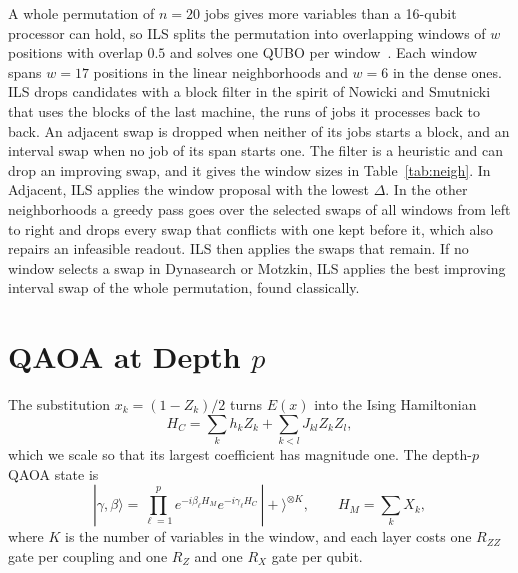 \documentclass[runningheads]{llncs}
\begin{document}
A whole permutation of $n = 20$ jobs gives more variables than a 16-qubit
processor can hold, so ILS splits the permutation into overlapping windows of
$w$ positions with overlap $0.5$ and solves one QUBO per
window~\cite{wojewodzki2026windowed,wojewodzki2026aciids}. Each window spans
$w = 17$ positions in the linear neighborhoods and $w = 6$ in the dense ones.
ILS drops candidates with a block filter in the spirit of Nowicki and
Smutnicki~\cite{nowicki1996} that uses the blocks of the last machine, the
runs of jobs it processes back to back. An adjacent swap is dropped when
neither of its jobs starts a block, and an interval swap when no job of its
span starts one. The filter is a heuristic and can drop an improving swap,
and it gives the window sizes in Table~\ref{tab:neigh}. In Adjacent, ILS
applies the window proposal with the lowest $\Delta$. In the other
neighborhoods a greedy pass goes over the selected swaps of all windows from
left to right and drops every swap that conflicts with one kept before it,
which also repairs an infeasible readout. ILS then applies the swaps that
remain. If no window selects a swap in Dynasearch or Motzkin, ILS applies
the best improving interval swap of the whole permutation, found
classically.

\section{QAOA at Depth $p$}

The substitution $x_k = (1 - Z_k)/2$ turns $E(x)$ into the Ising Hamiltonian
\begin{equation}
  H_C = \sum_k h_k Z_k + \sum_{k<l} J_{kl} Z_k Z_l ,
\end{equation}
which we scale so that its
largest coefficient has magnitude one. The depth-$p$ QAOA state is
\begin{equation}
  |\gamma,\beta\rangle = \prod_{\ell=1}^{p}
  e^{-i\beta_\ell H_M} e^{-i\gamma_\ell H_C} \, |{+}\rangle^{\otimes K},
  \qquad H_M = \sum_k X_k ,
\end{equation}
where $K$ is the number of variables in the window, and each layer costs one
$R_{ZZ}$ gate per coupling and one $R_Z$ and one
$R_X$ gate per qubit.
\end{document}
